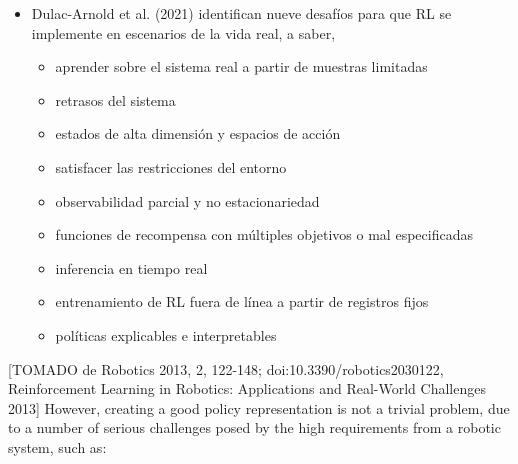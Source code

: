 \documentclass{svproc}
\begin{document}
\begin{itemize}
\item Dulac-Arnold et al. (2021) identifican nueve desafíos para que RL se implemente en escenarios de la vida real, a saber,
\begin{itemize}
    \item aprender sobre el sistema real a partir de muestras limitadas
    \item retrasos del sistema
    \item estados de alta dimensión y espacios de acción
    \item satisfacer las restricciones del entorno
    \item observabilidad parcial y no estacionariedad
    \item funciones de recompensa con múltiples objetivos o mal especificadas
    \item inferencia en tiempo real
    \item entrenamiento de RL fuera de línea a partir de registros fijos
    \item políticas explicables e interpretables
    
\end{itemize}


\end{itemize}


[TOMADO de Robotics 2013, 2, 122-148; doi:10.3390/robotics2030122, Reinforcement Learning in Robotics: Applications and Real-World Challenges 2013]
However, creating a good policy representation is not a trivial problem, due to a number of serious challenges posed by the high requirements from a robotic system, such as:
\end{document}
